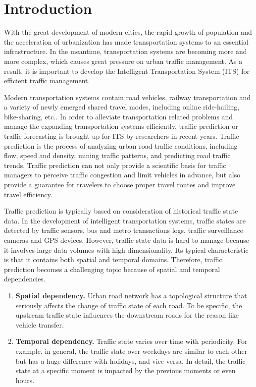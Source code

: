 
\section{Introduction}
With the great development of modern cities, the rapid growth of population and the acceleration of urbanization has made transportation systems to an essential infrastructure. In the meantime, transportation systems are becoming more and more complex, which causes great pressure on urban traffic management. As a result, it is important to develop the Intelligent Transportation System (ITS)\cite{ITS} for efficient traffic management.

Modern transportation systems contain road vehicles, railway transportation and a variety of newly emerged shared travel modes, including online ride-hailing, bike-sharing, etc.. In order to alleviate transportation related problems and manage the expanding transportation systems efficiently, traffic prediction or traffic forecasting is brought up for ITS by researchers in recent years. Traffic prediction is the process of analyzing urban road traffic conditions, including flow, speed and density, mining traffic patterns, and predicting road traffic trends. Traffic prediction can not only provide a scientific basis for traffic managers to perceive traffic congestion and limit vehicles in advance, but also provide a guarantee for travelers to choose proper travel routes and improve travel efficiency.

Traffic prediction is typically based on consideration of historical traffic state data. In the development of intelligent transportation systems, traffic states are detected by traffic sensors, bus and metro transactions logs, traffic surveillance cameras and GPS devices. However, traffic state data is hard to manage because it involves large data volumes with high dimensionality. Its typical characteristic is that it contains both spatial and temporal domains.
Therefore, traffic prediction becomes a challenging topic because of spatial and temporal dependencies.
\begin{enumerate}
    \item \textbf{Spatial dependency.} Urban road network has a topological structure that seriously affects the change of traffic state of each road. To be specific, the upstream traffic state influences the downstream roads for the reason like vehicle transfer.
    
    \item \textbf{Temporal dependency.} Traffic state varies over time with periodicity. For example, in general, the traffic state over weekdays are similar to each other but has a huge difference with holidays, and vice versa. In detail, the traffic state at a specific moment is impacted by the previous moments or even hours.
\end{enumerate}

